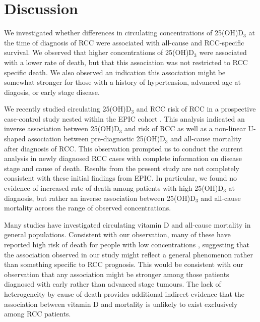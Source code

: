 \documentclass[a4paper,11pt]{article}
\renewcommand{\cite}{\citep}
\begin{document}
\section*{Discussion}
We investigated whether differences in circulating concentrations of 
25(OH)D$_3$ at the time of diagnosis of RCC were associated with all-cause and 
RCC-specific survival. We observed that higher concentrations of 25(OH)D$_3$ 
were associated with a lower rate of death, but that this association was not 
restricted to RCC specific death. We also observed an indication this 
association might be somewhat stronger for those with a 
history of hypertension, advanced age at diagosis, or early stage disease.

We recently studied circulating 25(OH)D$_3$ and RCC risk of RCC in a prospective
case-control study nested within the EPIC cohort \cite{muller_circulating_2014}.
This analysis indicated an inverse association between 
25(OH)D$_3$ and risk of RCC as well as a non-linear U-shaped association 
between pre-diagnostic 25(OH)D$_3$ and all-cause mortality after diagnosis 
of RCC. This observation prompted us to conduct the current analysis in newly 
diagnosed RCC cases with complete information on disease stage 
and cause of death. Results from the present study are not completely 
consistent with these initial findings from EPIC. In particular, we found no 
evidence of increased rate of death among patients with high 25(OH)D$_3$ at 
diagnosis, but rather an inverse association between 25(OH)D$_3$ and all-cause 
mortality across the range of observed concentrations.

Many studies have investigated circulating vitamin D and all-cause 
mortality in general populations. Consistent with our observation, many of these
have reported high risk of death for people with low concentrations 
\cite{schottker_strong_2013, virtanen_association_2011, hutchinson_low_2010, 
szulc_serum_2009, semba_low_2009, pilz_vitamin_2009, 
melamed_ml_25-hydroxyvitamin_2008, jia_nutritional_2007}, suggesting that 
the association observed in our study might reflect a general phenomenon rather 
than something specific to RCC prognosis. This would be consistent with our 
observation that any association might be stronger among those patients 
diagnosed with early rather than advanced stage tumours. The lack of 
heterogeneity by cause of death provides additional indirect evidence that the 
association between vitamin D and mortality is unlikely to exist exclusively 
among RCC patients. 
\end{document}
